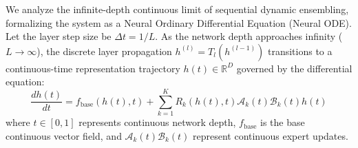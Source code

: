 \documentclass{article}
\theoremstyle{plain}
\theoremstyle{definition}
\theoremstyle{remark}
\begin{document}
We analyze the infinite-depth continuous limit of sequential dynamic ensembling, formalizing the system as a Neural Ordinary Differential Equation (Neural ODE). Let the layer step size be $\Delta t = 1/L$. As the network depth approaches infinity ($L \to \infty$), the discrete layer propagation $h^{(l)} = T_l(h^{(l-1)})$ transitions to a continuous-time representation trajectory $h(t) \in \mathbb{R}^D$ governed by the differential equation:
\begin{equation}
\label{eq:neural_ode}
\frac{dh(t)}{dt} = f_{\text{base}}(h(t), t) + \sum_{k=1}^K R_k(h(t), t) \mathcal{A}_k(t) \mathcal{B}_k(t) h(t)
\end{equation}
where $t \in [0, 1]$ represents continuous network depth, $f_{\text{base}}$ is the base continuous vector field, and $\mathcal{A}_k(t) \mathcal{B}_k(t)$ represent continuous expert updates.
\end{document}
